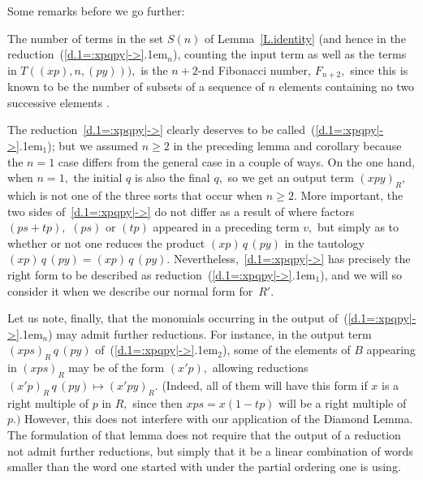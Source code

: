 \documentclass{amsart}
\begin{document}
Some remarks before we go further:

The number of terms in the set $S(n)$ of Lemma~\ref{L.identity}
(and hence in the reduction~({{\setlength{\mathsurround}{0em}\ref{d.1=:xpqpy|->}\kern.1em$_{{n}}$}}), counting the
input term as well as the terms in $T((xp),n,(py))),$
is the $\!n{+}2\!$-nd
Fibonacci number, $F_{n+2},$ since this is known to
be the number of subsets of a sequence of
$n$ elements containing no two successive elements
\cite[p.\,14, Problem~1(b)]{comb}.

The reduction~\eqref{d.1=:xpqpy|->} clearly deserves to be
called~({{\setlength{\mathsurround}{0em}\ref{d.1=:xpqpy|->}\kern.1em$_{{1}}$}}); but we assumed $n\geq 2$ in the preceding
lemma and corollary because the $n=1$ case differs from the
general case in a couple of ways.
On the one hand, when $n=1,$ the initial $q$ is also the final
$q,$ so we get an output term $(xpy)_R,$ which is
not one of the three sorts that occur when $n\geq 2.$
More important, the two sides of~\eqref{d.1=:xpqpy|->} do not
differ as a result of where factors $(ps+tp),$ $(ps)$ or $(tp)$
appeared in a preceding term $v,$ but simply as to
whether or not one reduces the product $(xp)\,q\,(py)$
in the tautology $(xp)\,q\,(py)=(xp)\,q\,(py).$
Nevertheless,~\eqref{d.1=:xpqpy|->} has precisely the right form
to be described as reduction~({{\setlength{\mathsurround}{0em}\ref{d.1=:xpqpy|->}\kern.1em$_{{1}}$}}), and we will so
consider it when we describe our normal form for~$R'.$

Let us note, finally, that the monomials occurring in the output
of~({{\setlength{\mathsurround}{0em}\ref{d.1=:xpqpy|->}\kern.1em$_{{n}}$}}) may admit further reductions.
For instance, in the output term $(xps)_R\,q\,(py)$ of~({{\setlength{\mathsurround}{0em}\ref{d.1=:xpqpy|->}\kern.1em$_{{2}}$}}),
some of the elements of $B$ appearing in $(xps)_R$ may
be of the form $(x'p),$
allowing reductions $(x'p)_R\,q\,(py)\mapsto (x'py)_R.$
(Indeed, all of them will have this form if $x$ is a right
multiple of $p$ in $R,$ since then $xps=x(1-tp)$ will be a right
multiple of $p.)$
However, this does not interfere with our application of
the Diamond Lemma.
The formulation of that lemma
does not require that the output of a reduction not
admit further reductions, but simply that it be a linear
combination of words smaller than
the word one started with under the partial ordering one is using.
\vspace{.5em}
\end{document}
